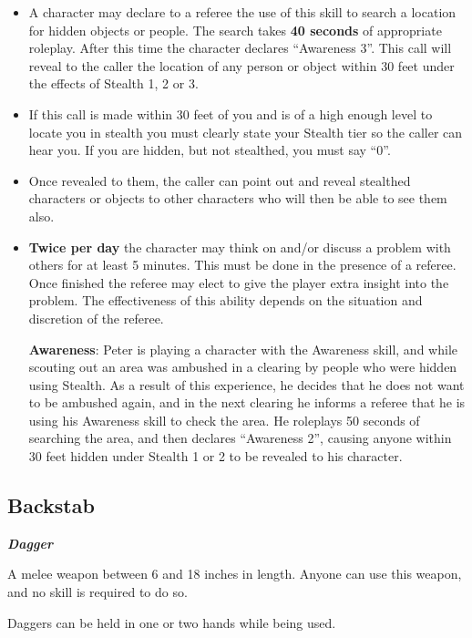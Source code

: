 \documentclass{scrbook}
\begin{document}
\begin{itemize}
\item A character may declare to a referee the use of this skill to search a location for hidden objects or people. The search takes \textbf{40 seconds} of appropriate roleplay. After this time the character declares ``Awareness 3''. This call will reveal to the caller the location of any person or object within 30 feet under the effects of Stealth 1, 2 or 3.

\item If this call is made within 30 feet of you and is of a high enough level to locate you in stealth you must clearly state your Stealth tier so the caller can hear you. If you are hidden, but not stealthed, you must say ``0''.

\item Once revealed to them, the caller can point out and reveal stealthed characters or objects to other characters who will then be able to see them also.

\item \textbf{Twice per day} the character may think on and/or discuss a problem with others for at least 5 minutes. This must be done in the presence of a referee. Once finished the referee may elect to give the player extra insight into the problem. The effectiveness of this ability depends on the situation and discretion of the referee.

\textbf{Awareness}: Peter is playing a character with the Awareness skill, and while scouting out an area was ambushed in a clearing by people who were hidden using Stealth. As a result of this experience, he decides that he does not want to be ambushed again, and in the next clearing he informs a referee that he is using his Awareness skill to check the area. He roleplays 50 seconds of searching the area, and then declares ``Awareness 2'', causing anyone within 30 feet hidden under Stealth 1 or 2 to be revealed to his character.

\end{itemize}

\subsection{Backstab}

\textbf{\textit{Dagger}}

A melee weapon between 6 and 18 inches in length. Anyone can use this weapon, and no skill is required to do so.

Daggers can be held in one or two hands while being used.
\end{document}
